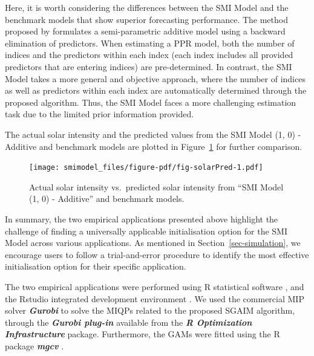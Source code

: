 \documentclass[11pt,a4paper,]{article}
\begin{document}
Here, it is worth considering the differences between the SMI Model and
the benchmark models that show superior forecasting performance. The
method proposed by \textcite{FH2012} formulates a semi-parametric
additive model using a backward elimination of predictors. When
estimating a PPR model, both the number of indices and the predictors
within each index (each index includes all provided predictors that are
entering indices) are pre-determined. In contrast, the SMI Model takes a
more general and objective approach, where the number of indices as well
as predictors within each index are automatically determined through the
proposed algorithm. Thus, the SMI Model faces a more challenging
estimation task due to the limited prior information provided.

The actual solar intensity and the predicted values from the SMI Model
(1, 0) - Additive and benchmark models are plotted in
Figure~\ref{fig-solarPred} for further comparison.

\begin{figure}

{\centering \texttt{[image: smimodel\_files/figure-pdf/fig-solarPred-1.pdf]}

}

\caption{\label{fig-solarPred}Actual solar intensity vs.~predicted solar
intensity from ``SMI Model (1, 0) - Additive'' and benchmark models.}

\end{figure}

In summary, the two empirical applications presented above highlight the
challenge of finding a universally applicable initialisation option for
the SMI Model across various applications. As mentioned in
Section~\ref{sec-simulation}, we encourage users to follow a
trial-and-error procedure to identify the most effective initialisation
option for their specific application.

The two empirical applications were performed using R statistical
software \autocite{R2023}, and the Rstudio integrated development
environment \autocite[IDE,][]{Rstudio2024}. We used the commercial MIP
solver \textbf{\emph{Gurobi}} \autocite{gurobi2023} to solve the MIQPs
related to the proposed SGAIM algorithm, through the
\textbf{\emph{Gurobi plug-in}}
\autocite[ROI.plugin.gurobi,][]{Schwendinger2023} available from the
\textbf{\emph{R Optimization Infrastructure}}
\autocites[ROI,][]{Hornik2023,Theusl2020} package. Furthermore, the GAMs
were fitted using the R package \textbf{\emph{mgcv}}
\autocite[v1.9.1,][]{Wood2011}.
\end{document}
